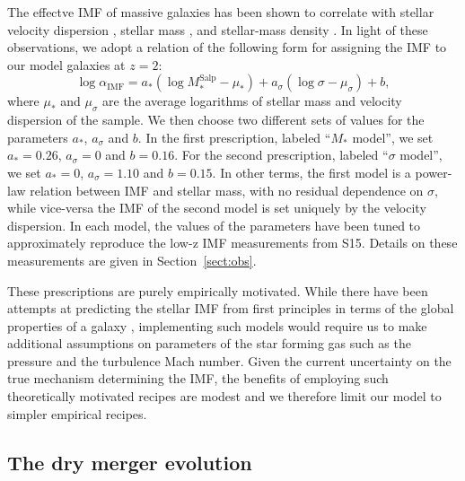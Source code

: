 \documentclass[usenatbib]{mnras}
\def\msalp{M_*^{\mathrm{Salp}}}
\def\aimf{\alpha_{\mathrm{IMF}}}
\def\Sref#1{Section~\ref{#1}\xspace}
\begin{document}
The effectve IMF of massive galaxies has been shown to correlate
with stellar velocity dispersion \citep[e.g.][]{Tre++10, CvD12,
  Cap++12, LaB++13, Spi++14, Pos++15}, stellar mass \citep{Aug++10b, Son++15},
 and stellar-mass density
\citep{Spi++15}.  In light of these observations, we adopt a relation
of the following form for assigning the IMF to our model galaxies at
$z=2$:
\begin{equation}\label{eq:imfform}
\log{\aimf} = a_*(\log{\msalp} - \mu_*) + a_\sigma(\log{\sigma} - \mu_\sigma) + b,
\end{equation}
where $\mu_*$ and $\mu_\sigma$ are the average logarithms of stellar mass and velocity dispersion of the sample.
We then choose two different sets of values for the parameters $a_*$, $a_\sigma$ and $b$. In the first prescription, labeled ``$M_*$ model'', we set $a_*=0.26$, $a_\sigma=0$ and $b=0.16$.
For the second prescription, labeled ``$\sigma$ model'', we set $a_*=0$, $a_\sigma=1.10$ and $b=0.15$.
In other terms, the first model is a power-law relation between IMF and stellar mass, with no residual dependence on $\sigma$, while vice-versa the IMF of the second model is set uniquely by the velocity dispersion.
In each model, the values of the parameters have been tuned to approximately reproduce the low-z IMF measurements from S15. Details on these measurements are given in \Sref{sect:obs}.

These prescriptions are purely empirically motivated. While there have been attempts at predicting the stellar IMF from first principles in terms of the global properties of a galaxy \citep[e.g.][]{Kru11,Hop12}, implementing such models would require us to make additional assumptions on parameters of the star forming gas such as the pressure and the turbulence Mach number.
Given the current uncertainty on the true mechanism determining the IMF, the benefits of employing such theoretically motivated recipes are modest and we therefore limit our model to simpler empirical recipes.


\subsection{The dry merger evolution}
\label{ssec:drymerger}
\end{document}
